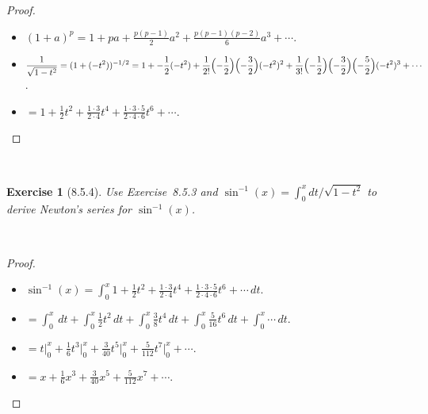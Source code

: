 \documentclass[12pt]{article}
\newcommand{\XB}{\color{black}}
\newcommand{\XBB}{\color{blue}}
\newcommand{\ds}{\displaystyle}
\theoremstyle{plain}
\newtheorem{ex}{Exercise}
\begin{document}
\begin{proof}
  \ \\

  \begin{itemize}
    \item $ \ds (1 + a)^{p} = 1 + pa + \frac{p(p - 1)}{2}a^{2} + \frac{p(p - 1)(p - 2)}{6}a^{3} + \cdots $.
    \item $ \ds \frac{1}{\sqrt{1 - t^{2}}} = (1 + (-t^{2}))^{-1/2} = 1 + -\frac{1}{2} (-t^{2}) + \frac{1}{2!} \Bigl( -\frac{1}{2} \Bigr) \Bigl( -\frac{3}{2} \Bigr) (-t^{2})^{2} + \frac{1}{3!} \Bigl( -\frac{1}{2} \Bigr) \Bigl( -\frac{3}{2} \Bigr) \Bigl( -\frac{5}{2} \Bigr) (-t^{2})^{3} + \cdots $.
    \item $ \ds = 1 + \frac{1}{2}t^{2} + \frac{1 \cdot 3}{2 \cdot 4}t^{4} + \frac{1 \cdot 3 \cdot 5}{2 \cdot 4 \cdot 6}t^{6} + \cdots $.
  \end{itemize}

\end{proof}

\newpage


\XBB\hrulefill\XB \\
\begin{ex} [8.5.4]
  Use Exercise~8.5.3 and $ \sin^{-1}(x) = \int_{0}^{x} dt/ \sqrt{1 - t^{2}} $ to derive Newton's series for $ \sin^{-1}(x) $.
\end{ex}
\XBB\hrulefill\XB \\

\begin{proof}
  \ \\

  \begin{itemize}
    \item $ \ds \sin^{-1}(x) = \int_{0}^{x} 1 + \frac{1}{2}t^{2} + \frac{1 \cdot 3}{2 \cdot 4}t^{4} + \frac{1 \cdot 3 \cdot 5}{2 \cdot 4 \cdot 6}t^{6} + \cdots \,dt $.
    \item $ \ds = \int_{0}^{x} \,dt + \int_{0}^{x} \frac{1}{2}t^{2} \,dt + \int_{0}^{x} \frac{3}{8}t^{4} \,dt + \int_{0}^{x} \frac{5}{16}t^{6} \,dt + \int_{0}^{x} \cdots \,dt $.
    \item $ \ds = t \Big|_{0}^{x} + \frac{1}{6}t^{3} \Big|_{0}^{x} + \frac{3}{40}t^{5} \Big|_{0}^{x} + \frac{5}{112}t^{7} \Big|_{0}^{x} + \cdots $.
    \item $ \ds = x + \frac{1}{6}x^{3} + \frac{3}{40}x^{5} + \frac{5}{112}x^{7} + \cdots $.
  \end{itemize}

\end{proof}

\newpage
\end{document}
